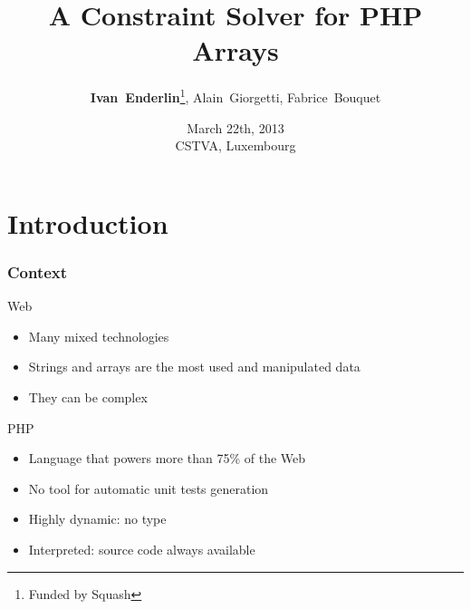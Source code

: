\documentclass[9pt]{beamer}
\title[A Constraint Solver for PHP Arrays]{A Constraint Solver for PHP Arrays}
\author[\textbf{I. Enderlin}, A. Giorgetti, F. Bouquet]{
    \textbf{Ivan~Enderlin}\footnote{Funded by Squash},
    Alain~Giorgetti,
    Fabrice~Bouquet
}
\date{
    March 22th, 2013 \\
    CSTVA, Luxembourg
}
\begin{document}
\maketitle

\section{Introduction}

\begin{frame}
\frametitle{Context}

\begin{block}{Web}
\begin{itemize}
\item Many mixed technologies
\item Strings and arrays are the most used and manipulated data
\item They can be complex
\end{itemize}
\end{block}

\begin{block}{PHP}
\begin{itemize}
\item Language that powers more than 75\% of the Web
\item No tool for automatic unit tests generation
\item Highly dynamic: no type
\item Interpreted: source code always available
\end{itemize}
\end{block}

\end{frame}
\end{document}
